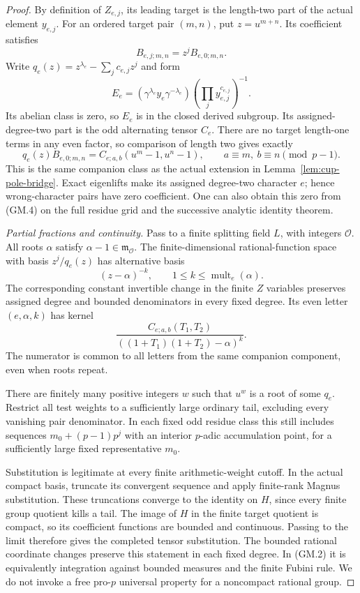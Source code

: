 \begin{proof}
By definition of $Z_{e,j}$, its leading target is the length-two
part of the actual element $y_{e,j}$. For an ordered target pair
$(m,n)$, put $z=u^{m+n}$. Its coefficient satisfies
\[
 B_{e,j;m,n}=z^jB_{e,0;m,n}.
\]
Write $q_e(z)=z^{\lambda_e}-\sum_jc_{e,j}z^j$ and form
\[
 E_e=(\gamma^{\lambda_e}y_e\gamma^{-\lambda_e})
       \left(\prod_jy_{e,j}^{c_{e,j}}\right)^{-1}.
\]
Its abelian class is zero, so $E_e$ is in the closed derived
subgroup. Its assigned-degree-two part is the odd alternating
tensor $C_e$. There are no target length-one terms in any even
factor, so comparison of length two gives exactly
\[
 q_e(z)B_{e,0;m,n}
   =C_{e;a,b}(u^m-1,u^n-1),\qquad
 a\equiv m,\ b\equiv n\pmod{p-1}.                           \tag{GM.4}
\]
This is the same companion class as the actual extension in
Lemma~\ref{lem:cup-pole-bridge}. Exact eigenlifts make its assigned
degree-two character $e$; hence wrong-character pairs have zero
coefficient. One can also obtain this zero from (GM.4) on the full
residue grid and the successive analytic identity theorem.

\emph{Partial fractions and continuity.}
Pass to a finite splitting field $L$, with integers $\mathcal O$.
All roots $\alpha$ satisfy $\alpha-1\in\mathfrak m_{\mathcal O}$.
The finite-dimensional rational-function space with basis
$z^j/q_e(z)$ has alternative basis
\[
 (z-\alpha)^{-k},\qquad
 1\le k\le\operatorname{mult}_e(\alpha).
\]
The corresponding constant invertible change in the finite $Z$
variables preserves assigned degree and bounded denominators in
every fixed degree. Its even letter $(e,\alpha,k)$ has kernel
\[
 \frac{C_{e;a,b}(T_1,T_2)}
      {((1+T_1)(1+T_2)-\alpha)^k}.                          \tag{GM.5}
\]
The numerator is common to all letters from the same companion
component, even when roots repeat.

There are finitely many positive integers $w$ such that $u^w$ is a
root of some $q_e$. Restrict all test weights to a sufficiently
large ordinary tail, excluding every vanishing pair denominator.
In each fixed odd residue class this still includes sequences
$m_0+(p-1)p^j$ with an interior $p$-adic accumulation point, for
a sufficiently large fixed representative $m_0$.

Substitution is legitimate at every finite arithmetic-weight cutoff.
In the actual compact basis, truncate its convergent sequence and
apply finite-rank Magnus substitution. These truncations converge
to the identity on $H$, since every finite group quotient kills a
tail. The image of $H$ in the finite target quotient is compact,
so its coefficient functions are bounded and continuous. Passing
to the limit therefore gives the completed tensor substitution.
The bounded rational coordinate changes preserve this statement in
each fixed degree. In (GM.2) it is equivalently integration against
bounded measures and the finite Fubini rule. We do not invoke a
free pro-$p$ universal property for a noncompact rational group.


\end{proof}
